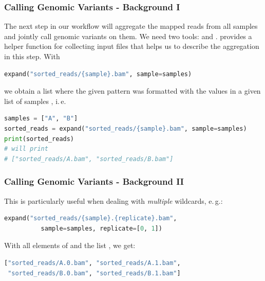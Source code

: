 \begin{frame}[fragile]
 \frametitle{Calling Genomic Variants - Background I}
 The next step in our workflow will aggregate the mapped reads from all samples and jointly call genomic variants on them. We need two tools:  and . \newline \pause
 \Snakemake{} provides a helper function for collecting input files that helps us to describe the aggregation in this step. With
 \begin{lstlisting}[language=Python,style=Python]
expand("sorted_reads/{sample}.bam", sample=samples)
 \end{lstlisting}
 we obtain a list where the given pattern  was formatted with the values in a given list of samples , i.\,e.
 \begin{lstlisting}[language=Python,style=Python]
samples = ["A", "B"]
sorted_reads = expand("sorted_reads/{sample}.bam", sample=samples)
print(sorted_reads)
# will print
# ["sorted_reads/A.bam", "sorted_reads/B.bam"]
 \end{lstlisting}
\end{frame}

\begin{frame}[fragile]
 \frametitle{Calling Genomic Variants - Background II}
 This is particularly useful when dealing with \emph{multiple} wildcards, e.\,g.:
 \begin{lstlisting}[language=Python,style=Python]
expand("sorted_reads/{sample}.{replicate}.bam", 
          sample=samples, replicate=[0, 1])
 \end{lstlisting}
 With all elements of  and the list \altverb{[0, 1]}, we get:
 \begin{lstlisting}[language=Python,style=Python]
["sorted_reads/A.0.bam", "sorted_reads/A.1.bam", 
 "sorted_reads/B.0.bam", "sorted_reads/B.1.bam"]
 \end{lstlisting}
\end{frame}
  
